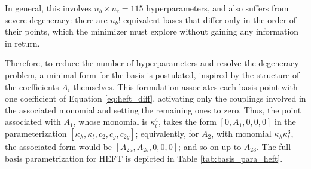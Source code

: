 In general, this involves $n_b\times n_c = 115$ hyperparameters, and also suffers from severe degeneracy: there are $n_b!$ equivalent bases that differ only in the order of their points, which the minimizer must explore without gaining any information in return.

Therefore, to reduce the number of hyperparameters and resolve the degeneracy problem, a minimal form for the basis is postulated, inspired by the structure of the coefficients $A_i$ themselves. This formulation associates each basis point with one coefficient of Equation \ref{eq:heft_diff}, activating only the couplings involved in the associated monomial and setting the remaining ones to zero. Thus, the point associated with $A_1$, whose monomial is $\kappa_t^4$, takes the form $[0,A_1,0,0,0]$ in the parameterization $[\kappa_\lambda,\kappa_t,c_2,c_g,c_{2g}]$; equivalently, for $A_2$, with monomial $\kappa_\lambda \kappa_t^3$, the associated form would be $[A_{2a},A_{2b},0,0,0]$; and so on up to $A_{23}$. The full basis parametrization for HEFT is depicted in Table \ref{tab:basis_para_heft}.
